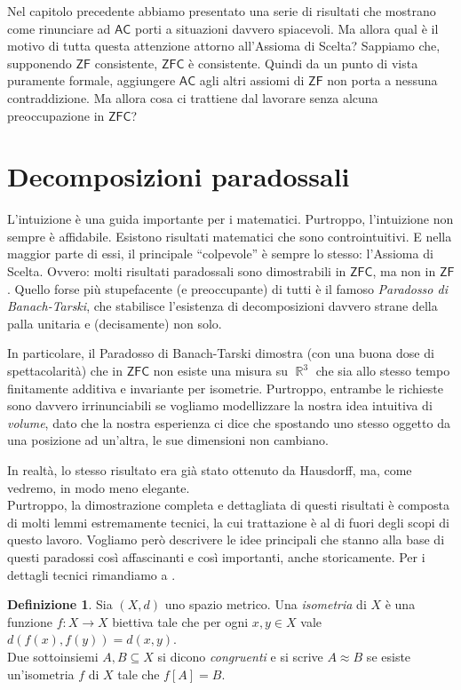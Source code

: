 \documentclass[12pt,a4paper]{report}
\theoremstyle{definition}
\newtheorem{defn}[teo]{Definizione}  %
\theoremstyle{num.custom-title}
\DeclareMathOperator{\R}{\mathbb{R}}
\newcommand{\AC}{\ensuremath{\mathsf{AC}}\xspace}
\newcommand{\ZF}{\ensuremath{\mathsf{ZF}}\xspace}
\newcommand{\ZFC}{\ensuremath{\mathsf{ZFC}}\xspace}
\begin{document}
Nel capitolo precedente abbiamo presentato una serie di risultati che mostrano come rinunciare ad \AC porti a situazioni davvero spiacevoli. Ma allora qual è il motivo di tutta questa attenzione attorno all'Assioma di Scelta? Sappiamo che, supponendo \ZF consistente, \ZFC è consistente. Quindi da un punto di vista puramente formale, aggiungere \AC agli altri assiomi di \ZF non porta a nessuna contraddizione. Ma allora cosa ci trattiene dal lavorare senza alcuna preoccupazione in \ZFC?

\section{Decomposizioni paradossali}

L'intuizione è una guida importante per i matematici. Purtroppo, l'intuizione non sempre è affidabile. Esistono risultati matematici che sono controintuitivi. E nella maggior parte di essi, il principale ``colpevole'' è sempre lo stesso: l'Assioma di Scelta. Ovvero: molti risultati paradossali sono dimostrabili in \ZFC, ma non in \ZF. Quello forse più stupefacente (e preoccupante) di tutti è il famoso \emph{Paradosso di Banach-Tarski}, che stabilisce l'esistenza di decomposizioni davvero strane della palla unitaria e (decisamente) non solo. 

In particolare, il Paradosso di Banach-Tarski dimostra (con una buona dose di spettacolarità) che in \ZFC non esiste una misura su $\R^3$ che sia allo stesso tempo finitamente additiva e invariante per isometrie. Purtroppo, entrambe le richieste sono davvero irrinunciabili se vogliamo modellizzare la nostra idea intuitiva di \emph{volume}, dato che la nostra esperienza ci dice che spostando uno stesso oggetto da una posizione ad un'altra, le sue dimensioni non cambiano.

In realtà, lo stesso risultato era già stato ottenuto da Hausdorff, ma, come vedremo, in modo meno elegante.\\

Purtroppo, la dimostrazione completa e dettagliata di questi risultati è composta di molti lemmi estremamente tecnici, la cui trattazione è al di fuori degli scopi di questo lavoro. Vogliamo però descrivere le idee principali che stanno alla base di questi paradossi così affascinanti e così importanti, anche storicamente. Per i dettagli tecnici rimandiamo a \cite{Wag86:Herrlich}.

\begin{defn}
Sia $(X,d)$ uno spazio metrico. Una \emph{isometria} di $X$ è una funzione $f: X \to X$ biettiva tale che per ogni $x,y \in X$ vale $d(f(x),f(y))=d(x,y)$.\\
Due sottoinsiemi $A,B \subseteq X$ si dicono \emph{congruenti} e si scrive $A \approx B$ se esiste un'isometria $f$ di $X$ tale che $f[A]=B$.
\end{defn}
\end{document}
